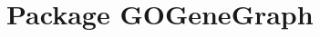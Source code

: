 \hypertarget{namespace_g_o_gene_graph}{
\section{Package GOGeneGraph}
\label{namespace_g_o_gene_graph}
}
